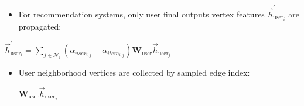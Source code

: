 \documentclass{beamer}
\begin{document}

\begin{frame}[fragile]
\begin{itemize}
\frametitle{(3) Aggregation: Case Study}
[ball]

\item For recommendation systems, only user final outputs vertex features $\overrightarrow{h}_{\text{user}_i}^{'}$ are propagated:

\end{itemize}

\vspace{0.3cm}

\begin{center}
    $\overrightarrow{h}_{\text{user}_i}^{'} = \sum_{j \in \mathcal{N}_{i}} (\alpha_{user_{i,j}}+\alpha_{item_{i,j}}) \mathbf{W}_{\text{user}}\overrightarrow{h}_{\text{user}_j}$
\end{center}

\end{frame}


\begin{frame}[fragile]
\begin{itemize}
\frametitle{(3) Aggregation: Code}
[ball]

\item User neighborhood vertices are collected by sampled edge index: 

\vspace{0.3cm}

\hspace{4cm} $\mathbf{W}_{\text{user}}\overrightarrow{h}_{\text{user}_j}$


\end{itemize}
\end{frame}

\end{document}
